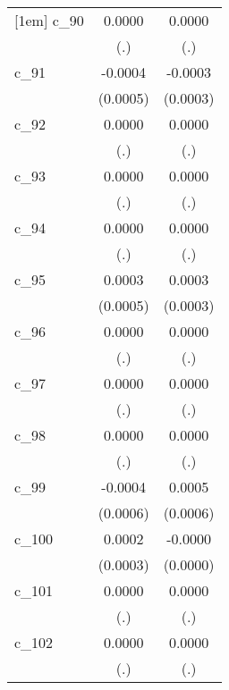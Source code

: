 {\begin{tabular}{l*{2}{c}}
[1em]
c\_90        &      0.0000        &      0.0000        \\
            &         (.)        &         (.)        \\
[1em]
c\_91        &     -0.0004        &     -0.0003        \\
            &    (0.0005)        &    (0.0003)        \\
[1em]
c\_92        &      0.0000        &      0.0000        \\
            &         (.)        &         (.)        \\
[1em]
c\_93        &      0.0000        &      0.0000        \\
            &         (.)        &         (.)        \\
[1em]
c\_94        &      0.0000        &      0.0000        \\
            &         (.)        &         (.)        \\
[1em]
c\_95        &      0.0003        &      0.0003        \\
            &    (0.0005)        &    (0.0003)        \\
[1em]
c\_96        &      0.0000        &      0.0000        \\
            &         (.)        &         (.)        \\
[1em]
c\_97        &      0.0000        &      0.0000        \\
            &         (.)        &         (.)        \\
[1em]
c\_98        &      0.0000        &      0.0000        \\
            &         (.)        &         (.)        \\
[1em]
c\_99        &     -0.0004        &      0.0005        \\
            &    (0.0006)        &    (0.0006)        \\
[1em]
c\_100       &      0.0002        &     -0.0000        \\
            &    (0.0003)        &    (0.0000)        \\
[1em]
c\_101       &      0.0000        &      0.0000        \\
            &         (.)        &         (.)        \\
[1em]
c\_102       &      0.0000        &      0.0000        \\
            &         (.)        &         (.)        \\

\end{tabular}}
